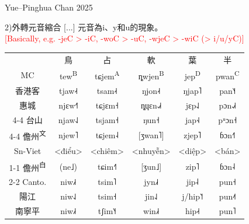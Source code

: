 \documentclass{beamer}
\begin{document}
\begin{frame}[fragile]{Yue–Pinghua \scriptsize{Chan 2025}}

{\small
2)外轉元音縮合 [...] 元音為i、y和u的現象。\\
\smallskip
\textcolor{red}{[Basically, e.g. -jeC > -iC, -woC > -uC, -wjeC > -wiC (> i/u/yC)]}\\
\begin{table}
    \flushleft
    \begin{tabular}{c|c c c c c}
         & 鳥 & 占 & 軟 & 葉 & 半\\
        MC & tew\textsuperscript{B} & tɕjem\textsuperscript{A} & ȵwjen\textsuperscript{B} & jep\textsuperscript{D} & pwan\textsuperscript{C}\\ \hline
        香港客 & tjaw˨˧ & tsam˨˧ & ŋjon˨˧ & ŋjap˥ & pan˥˧\\
        惠城 & njɛw˧˥ & tɕjɛm˧ & ȵɥɛn˨˩˧ & jɛp˨˩ & pɔn˨˩˧\\ \cline{4-4}
        台山 & njaw˨˩ & tsjam˧ & \multicolumn{1}{|c|}{ŋun˧} & jap˧˨ & pᵘɔn˧\\ \cline{4-4}
        儋州\textsuperscript{文} & njew˥ & tɕjem˨ & {[ʒwan˥]} & zjep˥ & ɓɔn˧˥\\
        Sn-Viet & <điểu> & <chiêm> & <nhuyễn> & <diệp> & <bán> \\ \cline{1-1} \cline{3-5}
        儋州\textsuperscript{白} &  \multicolumn{1}{c|}{(ne˩)} & tɕim˧˥ & {[ʒun˩]} & zip˥ &  \multicolumn{1}{|c}{ɓɔn˨}\\ \cline{2-2} \cline{6-6}
        Canto. & niw˩˧ & tsim˥ & jyn˩˧ & jip˨ & pun˧\\
        陽江 & niw˨˩ & tsim˧ & jin˨˩ & j/hip˥˦ & pun˨˦\\
        南寧平 & niw˩˧ & tʃim˥˧ & win˩˧ & hip˨˧ & pun˥\\     
    \end{tabular}
\end{table}
}
\end{frame}
\end{document}
